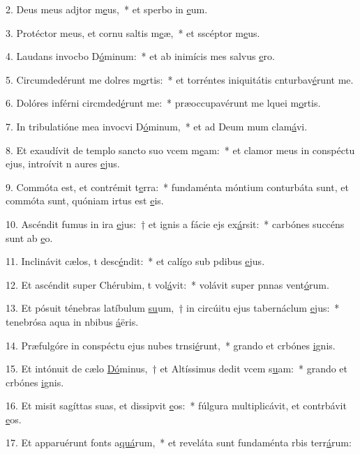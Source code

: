 2. Deus meus adjtor m\uline{e}us,~* et sperbo in \uline{e}um.\par 
3. Protéctor meus, et cornu saltis m\uline{e}æ,~* et sscéptor m\uline{e}us.\par 
4. Laudans invocbo D\uline{ó}minum:~* et ab inimícis mes salvus \uline{e}ro.\par 
5. Circumdedérunt me dolres m\uline{o}rtis:~* et torréntes iniquitátis cnturbav\uline{é}runt me.\par 
6. Dolóres inférni circmded\uline{é}runt me:~* præoccupavérunt me lquei m\uline{o}rtis.\par 
7. In tribulatióne mea invocvi D\uline{ó}minum,~* et ad Deum mum clam\uline{á}vi.\par 
8. Et exaudívit de templo sancto suo vcem m\uline{e}am:~* et clamor meus in conspéctu ejus, introívit n aures \uline{e}jus.\par 
9. Commóta est, et contrémit t\uline{e}rra:~* fundaménta móntium conturbáta sunt, et commóta sunt, quóniam irtus est \uline{e}is.\par 
10. Ascéndit fumus in ira \uline{e}jus:~† et ignis a fácie ejs ex\uline{á}rsit:~* carbónes succéns sunt ab \uline{e}o.\par 
11. Inclinávit cælos, t desc\uline{é}ndit:~* et calígo sub pdibus \uline{e}jus.\par 
12. Et ascéndit super Chérubim, t vol\uline{á}vit:~* volávit super pnnas vent\uline{ó}rum.\par 
13. Et pósuit ténebras latíbulum \uline{su}um,~† in circúitu ejus tabernáclum \uline{e}jus:~* tenebrósa aqua in nbibus \uline{á}ëris.\par 
14. Præfulgóre in conspéctu ejus nubes trnsi\uline{é}runt,~* grando et crbónes \uline{i}gnis.\par 
15. Et intónuit de cælo \uline{Dó}minus,~† et Altíssimus dedit vcem s\uline{u}am:~* grando et crbónes \uline{i}gnis.\par 
16. Et misit sagíttas suas, et dissipvit \uline{e}os:~* fúlgura multiplicávit, et contrbávit \uline{e}os.\par 
17. Et apparuérunt fonts a\uline{quá}rum,~* et reveláta sunt fundaménta rbis terr\uline{á}rum:\par 
